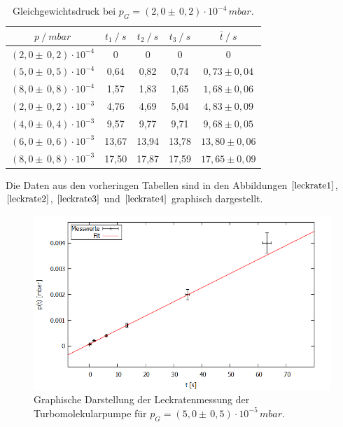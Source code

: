 \begin{table}[H]
\centering
\begin{tabular}{c|c|c|c|c}
	{$p \:/\: \si{mbar}$} & {$t_1 \:/\: \si{s} $} & {$t_2 \:/\: \si{s} $} & {$t_3 \:/\: \si{s} $} & {$\bar{t} \:/\: \si{s}$}\\
\midrule
$(2,0 \pm \, 0,2)\cdot 10^{-4}$ &0 &0 &0 &0\\
$(5,0 \pm \, 0,5)\cdot 10^{-4}$ &   0,64 &  0,82 &  0,74 & $0,73 \pm 0,04$\\
$(8,0 \pm \, 0,8)\cdot 10^{-4}$ &   1,57  &  1,83 &  1,65 & $1,68 \pm 0,06 $\\
$(2,0 \pm \, 0,2)\cdot 10^{-3}$ &   4,76 &  4,69 &  5,04 & $4,83 \pm 0,09 $\\
$(4,0 \pm \, 0,4)\cdot 10^{-3}$ &   9,57 &  9,77 &  9,71 & $9,68 \pm 0,05 $\\
$(6,0 \pm \, 0,6)\cdot 10^{-3}$ &   13,67 &  13,94 &  13,78 & $13,80 \pm 0,06 $\\
$(8,0 \pm \, 0,8)\cdot 10^{-3}$ &  17,50 & 17,87 & 17,59 & $17,65 \pm 0,09 $\\
\end{tabular}
\caption{Gleichgewichtsdruck bei $p_G=(2,0 \pm \, 0,2)\cdot 10^{-4} \, \si{mbar}$.}
\label{tab:leck_Turbo4}
\end{table}
Die Daten aus den vorheringen Tabellen sind in den Abbildungen $\ref{leckrate1}$, $\ref{leckrate2}$, $\ref{leckrate3}$ und $\ref{leckrate4}$ graphisch dargestellt.
\begin{figure}[H]
  \centering
  \includegraphics[width=14cm]{bilder/leckratefit1.png}
  \caption{Graphische Darstellung der Leckratenmessung der Turbomolekularpumpe für $p_G=(5,0 \pm \, 0,5)\cdot 10^{-5} \, \si{mbar}$.}
  \label{leckrate1}
\end{figure}
